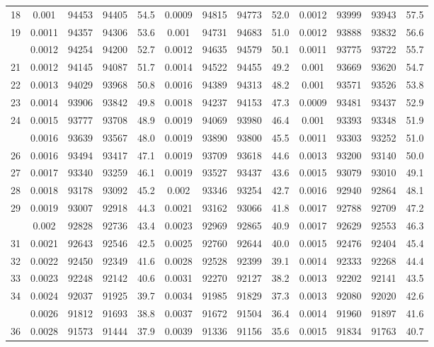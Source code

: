 \documentclass[
  14pt,
]{article}
\begin{document}
\begin{longtable}[t]{lcccccccccccc}
18 & 0.001 & 94453 & 94405 & 54.5 & 0.0009 & 94815 & 94773 & 52.0 & 0.0012 & 93999 & 93943 & 57.5\\
19 & 0.0011 & 94357 & 94306 & 53.6 & 0.001 & 94731 & 94683 & 51.0 & 0.0012 & 93888 & 93832 & 56.6\\
\addlinespace
20 & 0.0012 & 94254 & 94200 & 52.7 & 0.0012 & 94635 & 94579 & 50.1 & 0.0011 & 93775 & 93722 & 55.7\\
21 & 0.0012 & 94145 & 94087 & 51.7 & 0.0014 & 94522 & 94455 & 49.2 & 0.001 & 93669 & 93620 & 54.7\\
22 & 0.0013 & 94029 & 93968 & 50.8 & 0.0016 & 94389 & 94313 & 48.2 & 0.001 & 93571 & 93526 & 53.8\\
23 & 0.0014 & 93906 & 93842 & 49.8 & 0.0018 & 94237 & 94153 & 47.3 & 0.0009 & 93481 & 93437 & 52.9\\
24 & 0.0015 & 93777 & 93708 & 48.9 & 0.0019 & 94069 & 93980 & 46.4 & 0.001 & 93393 & 93348 & 51.9\\
\addlinespace
25 & 0.0016 & 93639 & 93567 & 48.0 & 0.0019 & 93890 & 93800 & 45.5 & 0.0011 & 93303 & 93252 & 51.0\\
26 & 0.0016 & 93494 & 93417 & 47.1 & 0.0019 & 93709 & 93618 & 44.6 & 0.0013 & 93200 & 93140 & 50.0\\
27 & 0.0017 & 93340 & 93259 & 46.1 & 0.0019 & 93527 & 93437 & 43.6 & 0.0015 & 93079 & 93010 & 49.1\\
28 & 0.0018 & 93178 & 93092 & 45.2 & 0.002 & 93346 & 93254 & 42.7 & 0.0016 & 92940 & 92864 & 48.1\\
29 & 0.0019 & 93007 & 92918 & 44.3 & 0.0021 & 93162 & 93066 & 41.8 & 0.0017 & 92788 & 92709 & 47.2\\
\addlinespace
30 & 0.002 & 92828 & 92736 & 43.4 & 0.0023 & 92969 & 92865 & 40.9 & 0.0017 & 92629 & 92553 & 46.3\\
31 & 0.0021 & 92643 & 92546 & 42.5 & 0.0025 & 92760 & 92644 & 40.0 & 0.0015 & 92476 & 92404 & 45.4\\
32 & 0.0022 & 92450 & 92349 & 41.6 & 0.0028 & 92528 & 92399 & 39.1 & 0.0014 & 92333 & 92268 & 44.4\\
33 & 0.0023 & 92248 & 92142 & 40.6 & 0.0031 & 92270 & 92127 & 38.2 & 0.0013 & 92202 & 92141 & 43.5\\
34 & 0.0024 & 92037 & 91925 & 39.7 & 0.0034 & 91985 & 91829 & 37.3 & 0.0013 & 92080 & 92020 & 42.6\\
\addlinespace
35 & 0.0026 & 91812 & 91693 & 38.8 & 0.0037 & 91672 & 91504 & 36.4 & 0.0014 & 91960 & 91897 & 41.6\\
36 & 0.0028 & 91573 & 91444 & 37.9 & 0.0039 & 91336 & 91156 & 35.6 & 0.0015 & 91834 & 91763 & 40.7\\

\end{longtable}
\end{document}
